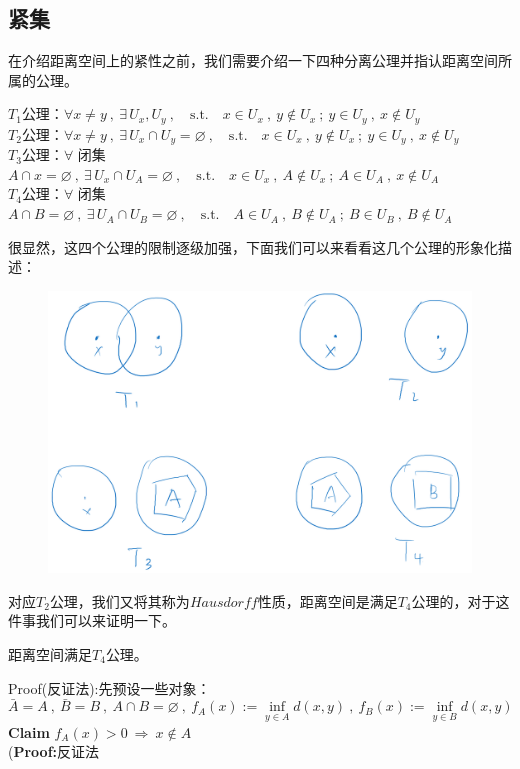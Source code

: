 \subsection{紧集}
在介绍距离空间上的紧性之前，我们需要介绍一下四种分离公理并指认距离空间所属的公理。
\begin{proposition}[分离公理]
    $T_1$公理：$\forall x \neq y \ , \ \exists \, U_x,U_y \ , \quad \text{s.t.} \quad x \in U_x \ , \ y \notin U_x \ ; \ y \in U_y \ , \ x \notin U_y$\\
    $T_2$公理：$\forall x \neq y \ , \ \exists \, U_x \cap U_y=\varnothing \ , \quad \text{s.t.} \quad x \in U_x \ , \ y \notin U_x \ ; \ y \in U_y \ , \ x \notin U_y$\\
    $T_3$公理：$\forall$ 闭集$A \cap x=\varnothing \ , \ \exists \, U_x \cap U_A=\varnothing \ , \quad \text{s.t.} \quad x \in U_x \ , \ A \notin U_x \ ; \ A \in U_A \ , \ x \notin U_A$\\
    $T_4$公理：$\forall$ 闭集$A \cap B=\varnothing \ , \ \exists \, U_A \cap U_B=\varnothing \ , \quad \text{s.t.} \quad A \in U_A \ , \ B \notin U_A \ ; \ B \in U_B \ , \ B \notin U_A$
\end{proposition}
很显然，这四个公理的限制逐级加强，下面我们可以来看看这几个公理的形象化描述：
\begin{figure}[htbp]
    \center
    \includegraphics[scale=0.4]{./fig/2.2.2.png}
\end{figure}
对应$T_2$公理，我们又将其称为$Hausdorff$性质，距离空间是满足$T_4$公理的，对于这件事我们可以来证明一下。
\begin{theorem}
    距离空间满足$T_4$公理。
\end{theorem}
Proof(反证法):先预设一些对象：
\[\bar{A}=A \ , \ \bar{B}=B \ , \ A \cap B=\varnothing \ , \ f_A(x):=\mathop {\text{inf}}\limits_{y \in A}d(x,y) \ , \ f_B(x):=\mathop {\text{inf}}\limits_{y \in B}d(x,y)\]
\textbf{Claim} \quad $f_A(x)>0 \ \Rightarrow \ x \notin A$\\
(\textbf{Proof:}反证法

